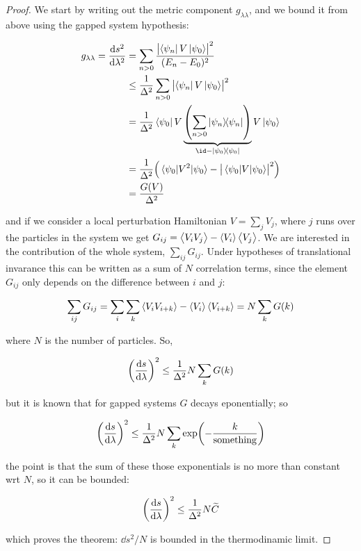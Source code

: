 \documentclass[main.tex]{subfiles}
\begin{document}
\begin{proof} We start by writing out the metric component \(g_{\lambda \lambda}\), and we bound it from above using the gapped system hypothesis:

  \begin{subequations}
  \begin{align}
    g_{\lambda \lambda} = \dv{s^2}{\lambda^2}  &= \sum _{n>0}  \frac{\abs{\bra{\psi_n} V \ket{\psi_0}}^2}{(E_n - E_0)^2}  \\
    &\leq \frac{1}{\Delta^2} \sum _{n>0} \abs{\bra{\psi_n} V \ket{\psi_0}}^2  \\
    &=  \frac{1}{\Delta^2} \bra{\psi_0} V    \underbrace{\qty(\sum _{n>0}\dyad{\psi_n})}_{\substack{\id - \ketbra{\psi_0}{\psi_0}}} V \ket{\psi_0} \\
    &=  \frac{1}{\Delta^2} \qty(\ev{V^2}{\psi_0} - \abs{\ev{V}{\psi_0}}^2)  \\
    &= \frac{G (V)}{\Delta^2}
  \end{align}
  \end{subequations}

  and if we consider a local perturbation Hamiltonian \(V = \sum _{j}  V_j \), where \(j\) runs over the particles in the system we get \(G _{ij} = \expval{V_i V_j} - \expval{V_i} \expval{V_j}\). We are interested in the contribution of the whole system, \(\sum_{ij} G_{ij}\). Under hypotheses of translational invarance this can be written as a sum of \(N\) correlation terms, since the element \(G_{ij}\) only depends on the difference between \(i\) and \(j\):

  \begin{equation}
      \sum_{ij} G_{ij} =  \sum_i\sum _k \expval{V_i V_{i+k}} - \expval{V_i} \expval{V_{i+k}} = N \sum_k G(k)
  \end{equation}

  where \(N\) is the number of particles. So,

  \begin{equation}
    \qty(\dv{s}{\lambda} )^2 \leq \frac{1}{\Delta^2} N \sum _{k} G(k)
  \end{equation}

  but it is known that for gapped systems \(G\) decays eponentially; so

  \begin{equation}
    \qty(\dv{s}{\lambda} )^2 \leq \frac{1}{\Delta^2} N \sum _{k} \exp(-\frac{k}{\text{something}})
  \end{equation}

  the point is that the sum of these those exponentials is no more than constant wrt \(N\), so it can be bounded:

  \begin{equation}
    \qty(\dv{s}{\lambda} )^2 \leq \frac{1}{\Delta^2} N \widetilde{C}
  \end{equation}

  which proves the theorem: \(\dd{s}^2 /N \) is bounded in the thermodinamic limit.
\end{proof}
\end{document}
